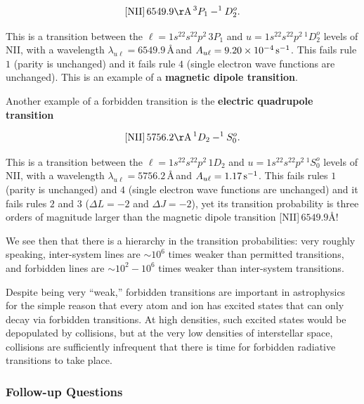 \documentclass[a4paper,10pt]{article}
\begin{document}
\begin{align*}
    {\rm [NII]}\,6549.9{\rm \AA}\,^3P_1-^1D_2^o.
\end{align*}

{\noindent}This is a transition between the $\ell=1s^22s^22p^2\,3P_1$ and $u=1s^22s^22p^2\,^1D_2^o$ levels of NII, with a wavelength $\lambda_{u\ell}=6549.9$\,\AA\,and $A_{u\ell}=9.20\times10^{-4}\,{\rm s^{-1}}$. This fails rule $1$ (parity is unchanged) and it fails rule $4$ (single electron wave functions are unchanged). This is an example of a \textbf{magnetic dipole transition}.

{\noindent}Another example of a forbidden transition is the \textbf{electric quadrupole transition}

\begin{align*}
    {\rm [NII]}\,5756.2{\rm \AA}\,^1D_2-^1S_0^o.
\end{align*}

{\noindent}This is a transition between the $\ell=1s^22s^22p^2\,1D_2$ and $u=1s^22s^22p^2\,^1S_0^o$ levels of NII, with a wavelength $\lambda_{u\ell}=5756.2$\,\AA\,and $A_{u\ell}=1.17\,{\rm s^{-1}}$. This fails rules $1$ (parity is unchanged) and $4$ (single electron wave functions are unchanged) and it fails rules $2$ and $3$ ($\Delta L=-2$ and $\Delta J=-2$), yet its transition probability is three orders of magnitude larger than the magnetic dipole transition [NII]\,$6549.9$\AA!

{\noindent}We see then that there is a hierarchy in the transition probabilities: very roughly speaking, inter-system lines are $\sim10^6$ times weaker than permitted transitions, and forbidden lines are $\sim10^2-10^6$ times weaker than inter-system transitions.

{\noindent}Despite being very ``weak,'' forbidden transitions are important in astrophysics for the simple reason that every atom and ion has excited states that can only decay via forbidden transitions. At high densities, such excited states would be depopulated by collisions, but at the very low densities of interstellar space, collisions are sufficiently infrequent that there is time for forbidden radiative transitions to take place.

\subsubsection{Follow-up Questions}
\end{document}
